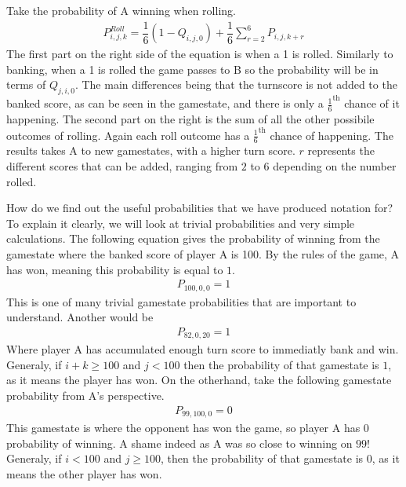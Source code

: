 \documentclass[a4paper,titlepage]{article}
\begin{document}
Take the probability of A winning when rolling.
\begin{align*}
P^{Roll}_{i,j,k} = \dfrac{1}{6} (1-Q_{i,j,0}) + \dfrac{1}{6}\sum^{6}_{r=2}P_{i,j,k+r}
\end{align*}
The first part on the right side of the equation is when a 1 is rolled. Similarly to banking, when a 1 is rolled the game passes to B so the probability will be in terms of $Q_{j,i,0}$.
The main differences being that the turnscore is not added to the banked score, as can be seen in the gamestate, and there is only a $\frac{1}{6}^\text{th}$ chance of it happening.
The second part on the right is the sum of all the other possibile outcomes of rolling. Again each roll outcome has a $\frac{1}{6}^\text{th}$ chance of happening.
The results takes A to new gamestates, with a higher turn score. $r$ represents the different scores that can be added, ranging from $2$ to $6$ depending on the number rolled.

How do we find out the useful probabilities that we have produced notation for?
To explain it clearly, we will look at trivial probabilities and very simple calculations.
The following equation gives the probability of winning from the gamestate where the banked score of player A is 100. By the rules of the game, A has won, meaning this probability is equal to $1$.
\begin{align*}
	P_{100,0,0}=1
\end{align*}
This is one of many trivial gamestate probabilities that are important to understand. Another would be
\begin{align*}
	P_{82,0,20}=1
\end{align*}
Where player A has accumulated enough turn score to immediatly bank and win.
Generaly, if $i+k\geq100$ and $j<100$ then the probability of that gamestate is $1$, as it means the player has won.
On the otherhand, take the following gamestate probability from A's perspective.
\begin{align*}
	P_{99,100,0}=0
\end{align*}
This gamestate is where the opponent has won the game, so player A has 0 probability of winning. A shame indeed as A was so close to winning on $99$!
Generaly, if $i<100$ and $j\geq100$, then the probability of that gamestate is $0$, as it means the other player has won.
\end{document}
